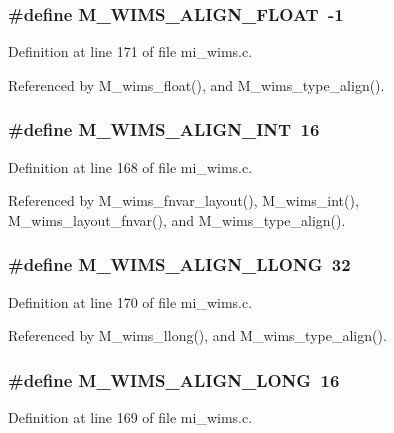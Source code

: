 \subsubsection{\setlength{\rightskip}{0pt plus 5cm}\#define M\_\-WIMS\_\-ALIGN\_\-FLOAT~-1}\label{mi__wims_8c_76004af1f6bc9dd97d05c76dba137798}




Definition at line 171 of file mi\_\-wims.c.

Referenced by M\_\-wims\_\-float(), and M\_\-wims\_\-type\_\-align().
\subsubsection{\setlength{\rightskip}{0pt plus 5cm}\#define M\_\-WIMS\_\-ALIGN\_\-INT~16}\label{mi__wims_8c_9826d1e24dc9c8e02feadf58c7b4995a}




Definition at line 168 of file mi\_\-wims.c.

Referenced by M\_\-wims\_\-fnvar\_\-layout(), M\_\-wims\_\-int(), M\_\-wims\_\-layout\_\-fnvar(), and M\_\-wims\_\-type\_\-align().
\subsubsection{\setlength{\rightskip}{0pt plus 5cm}\#define M\_\-WIMS\_\-ALIGN\_\-LLONG~32}\label{mi__wims_8c_a725adf4ca06adff0e6cb93272642ce9}




Definition at line 170 of file mi\_\-wims.c.

Referenced by M\_\-wims\_\-llong(), and M\_\-wims\_\-type\_\-align().
\subsubsection{\setlength{\rightskip}{0pt plus 5cm}\#define M\_\-WIMS\_\-ALIGN\_\-LONG~16}\label{mi__wims_8c_18589113dd20f6769745d1d9ebd7f990}




Definition at line 169 of file mi\_\-wims.c.

